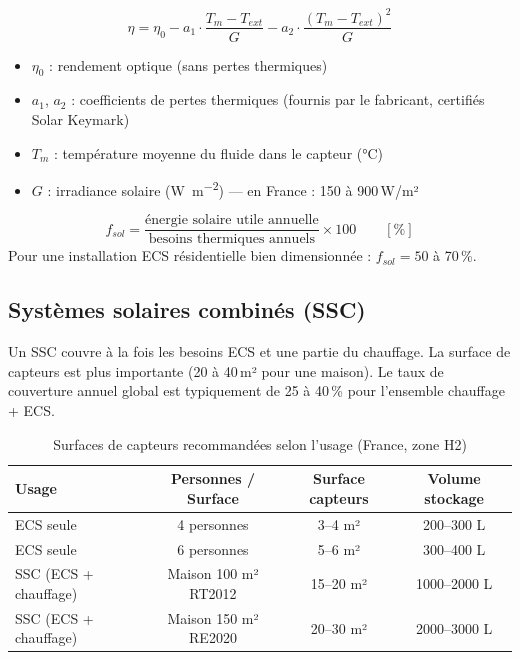 \begin{definition}[title=Rendement d'un capteur solaire plan]
\begin{equation}
  \eta = \eta_0 - a_1 \cdot \frac{T_m - T_{ext}}{G} - a_2 \cdot \frac{(T_m - T_{ext})^2}{G}
\end{equation}
\begin{itemize}
  \item $\eta_0$ : rendement optique (sans pertes thermiques)
  \item $a_1$, $a_2$ : coefficients de pertes thermiques (fournis par le fabricant, certifiés Solar Keymark)
  \item $T_m$ : température moyenne du fluide dans le capteur (\si{\celsius})
  \item $G$ : irradiance solaire (\si{\watt\per\square\metre}) — en France : 150 à 900\,W/m²
\end{itemize}
\end{definition}

\begin{definition}[title=Taux de couverture solaire]
\begin{equation}
  f_{sol} = \frac{\text{énergie solaire utile annuelle}}{\text{besoins thermiques annuels}} \times 100 \qquad [\%]
\end{equation}
Pour une installation ECS résidentielle bien dimensionnée : $f_{sol} = 50$ à 70\,\%.
\end{definition}

\subsection{Systèmes solaires combinés (SSC)}

Un SSC couvre à la fois les besoins ECS et une partie du chauffage. La surface de capteurs est plus importante (20 à 40\,m² pour une maison). Le taux de couverture annuel global est typiquement de 25 à 40\,\% pour l'ensemble chauffage + ECS.

\begin{table}[H]
  \centering
  \caption{Surfaces de capteurs recommandées selon l'usage (France, zone H2)}
  \begin{tabular}{lccc}
    \toprule
    Usage & Personnes / Surface & Surface capteurs & Volume stockage \\
    \midrule
    ECS seule & 4 personnes & 3–4 m² & 200–300 L \\
    ECS seule & 6 personnes & 5–6 m² & 300–400 L \\
    SSC (ECS + chauffage) & Maison 100 m² RT2012 & 15–20 m² & 1000–2000 L \\
    SSC (ECS + chauffage) & Maison 150 m² RE2020 & 20–30 m² & 2000–3000 L \\
    \bottomrule
  \end{tabular}
\end{table}

